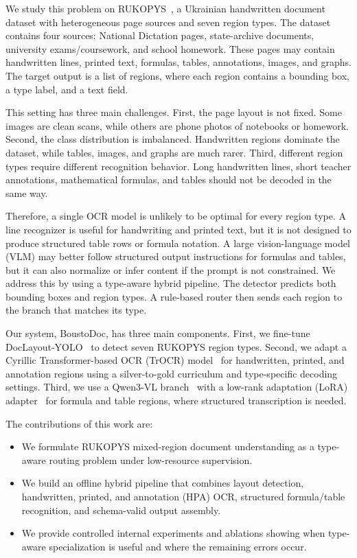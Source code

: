 \documentclass[runningheads]{llncs}
\begin{document}
We study this problem on RUKOPYS~\cite{rukopys_2026}, a Ukrainian handwritten document dataset with heterogeneous page sources and seven region types. The dataset contains four sources: National Dictation pages, state-archive documents, university exams/coursework, and school homework. These pages may contain handwritten lines, printed text, formulas, tables, annotations, images, and graphs. The target output is a list of regions, where each region contains a bounding box, a type label, and a text field.

This setting has three main challenges. First, the page layout is not fixed. Some images are clean scans, while others are phone photos of notebooks or homework. Second, the class distribution is imbalanced. Handwritten regions dominate the dataset, while tables, images, and graphs are much rarer. Third, different region types require different recognition behavior. Long handwritten lines, short teacher annotations, mathematical formulas, and tables should not be decoded in the same way.

Therefore, a single OCR model is unlikely to be optimal for every region type. A line recognizer is useful for handwriting and printed text, but it is not designed to produce structured table rows or formula notation. A large vision-language model (VLM) may better follow structured output instructions for formulas and tables, but it can also normalize or infer content if the prompt is not constrained. We address this by using a type-aware hybrid pipeline. The detector predicts both bounding boxes and region types. A rule-based router then sends each region to the branch that matches its type.

Our system, BoustoDoc, has three main components. First, we fine-tune DocLayout-YOLO~\cite{zhao2024doclayoutyolo} to detect seven RUKOPYS region types. Second, we adapt a Cyrillic Transformer-based OCR (TrOCR) model~\cite{li2023trocr} for handwritten, printed, and annotation regions using a silver-to-gold curriculum and type-specific decoding settings. Third, we use a Qwen3-VL branch~\cite{qwen3vltechnicalreport} with a low-rank adaptation (LoRA) adapter~\cite{hu2022lora} for formula and table regions, where structured transcription is needed.

The contributions of this work are:
\begin{itemize}
  \item We formulate RUKOPYS mixed-region document understanding as a type-aware routing problem under low-resource supervision.
  \item We build an offline hybrid pipeline that combines layout detection, handwritten, printed, and annotation (HPA) OCR, structured formula/table recognition, and schema-valid output assembly.
  \item We provide controlled internal experiments and ablations showing when type-aware specialization is useful and where the remaining errors occur.
\end{itemize}
\end{document}
